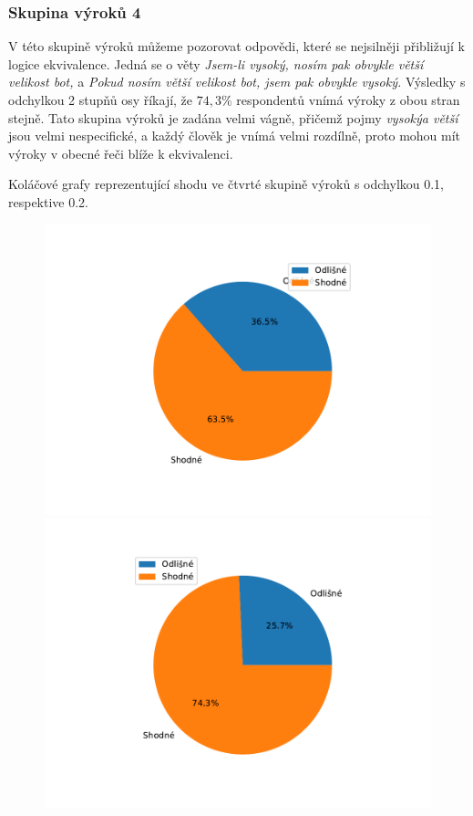 \subsubsection{Skupina výrok\r u 4}
V této skupině výrok\r u m\r užeme pozorovat odpovědi, které se nejsilněji přibližují k logice ekvivalence. Jedná se o věty \textit{\clqq Jsem-li vysoký, nosím pak obvykle větší velikost bot,\crqq } \space a \textit{\clqq Pokud nosím větší velikost bot, jsem pak obvykle vysoký.\crqq } \space Výsledky s odchylkou 2 stup\v n\r u osy říkají, že $74,3 $\space$ \%$ respondent\r u vnímá výroky z obou stran stejně. Tato skupina výrok\r u je zadána velmi vágně, přičemž pojmy \textit{\clqq vysoký\crqq  a \clqq větší\crqq } jsou velmi nespecifické, a každý člověk je vnímá velmi rozdílně, proto mohou mít výroky v obecné řeči blíže k ekvivalenci.
\begin{graph}
Koláčové grafy reprezentující shodu ve čtvrté skupině výrok\r u s odchylkou 0.1, respektive 0.2.
    \begin{figure}[H]
                \includegraphics[scale=0.5]{template-fig/group3.pdf}
                \includegraphics[scale=0.5]{template-fig/group33.pdf}
            \end{figure}
\end{graph}
